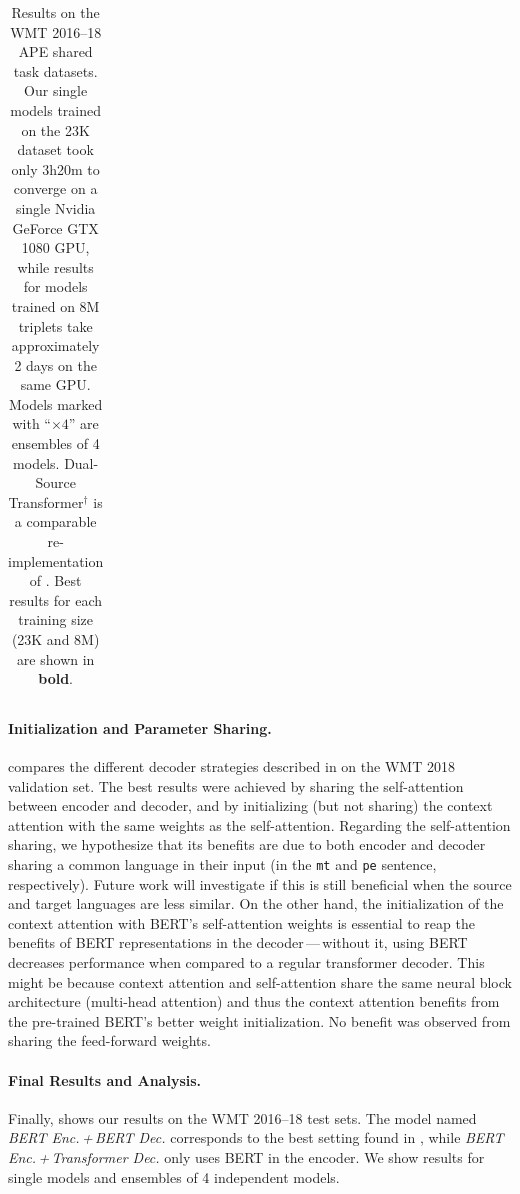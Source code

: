 \begin{landscape}
\begin{table}[t]
\begin{tabular}{lccccccc}
            \bottomrule
        \end{tabular}
        \caption[Results on the WMT 2016--18 APE shared task datasets.]{
            Results on the WMT 2016--18 APE shared task datasets. Our
            single models trained on the 23K dataset took only 3h20m to converge
            on a single Nvidia GeForce GTX 1080 GPU, while results for models
            trained on 8M triplets take approximately 2 days on the same GPU.
            Models marked with ``$\times 4$'' are ensembles of 4 models.
            Dual-Source Transformer$^\dagger$ is a comparable re-implementation
            of \citet{junczys2018ms}. Best results for each training size (23K and 8M) are shown in \textbf{bold}.}
        \label{tab:results_smt}
    \end{table}
\end{landscape}

\paragraph*{Initialization and Parameter Sharing.}
 compares the different decoder
strategies described in  on the WMT 2018
validation set. The best results were achieved by sharing the
self-attention between encoder and decoder, and by initializing (but
not sharing) the context attention with the same weights as the
self-attention. Regarding the self-attention sharing, we hypothesize
that its benefits are due to both encoder and decoder sharing a
common language in their input (in the {\tt mt} and {\tt pe}
sentence, respectively). Future work will investigate if this is
still beneficial when the source and target languages are less
similar. On the other hand, the initialization of the context
attention with BERT's self-attention weights is essential to reap the
benefits of BERT representations in the decoder\,---\,without it, using
BERT decreases performance when compared to a regular transformer
decoder. This might be because context attention and
self-attention share the same neural block architecture (multi-head
attention) and thus the context attention benefits from the
pre-trained BERT's better weight initialization. No benefit was
observed from sharing the feed-forward weights.

\paragraph*{Final Results and Analysis.}
Finally,  shows our results on the WMT
2016--18 test sets. The model named \emph{BERT Enc.\,+\,BERT Dec.}
corresponds to the best setting found in
, while \emph{BERT Enc.\,+\,Transformer
    Dec.} only uses BERT in the encoder. We show results for single
models and ensembles of 4 independent models.

